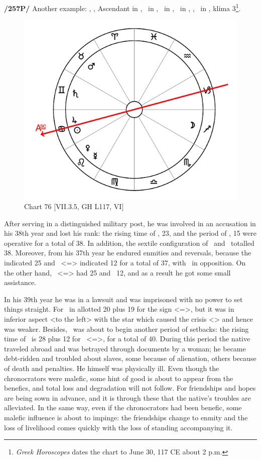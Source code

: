 \textbf{/257P/} Another example: \Sun, \Jupiter, Ascendant in \Cancer, \Moon\, in \Sagittarius, \Saturn\, in \Gemini,
\Mars\, in \Taurus, \Venus, \Mercury\, in \Leo, klima 3\footnote{\textit{Greek Horoscopes} dates the chart to June 30, 117 CE about 2 p.m.}.

\begin{figure}
\centering
\vspace{-20pt}
\includegraphics[width=.68\textwidth]{charts/7_3_5}
\caption{Chart 76 [VII.3.5, GH L117, VI]}
\label{fig:chart76}
\end{figure} 

After serving in a distinguished military post, he was involved in an accusation in his 38th year and lost his rank: the rising time of \Taurus, 23, and the period of \Mars, 15 were operative for a total of 38. In addition, the sextile configuration of \Saturn\, and \Venus\, totalled 38. Moreover, from his 37th year he endured enmities and reversals, because the \Moon\, indicated 25 and \Sagittarius\, <=\Jupiter> indicated 12 for a total of 37, with \Saturn\, in opposition. On the other hand, \Cancer\, <=\Moon> had 25 and \Jupiter\, 12, and as a result he got some small assistance. 

In his 39th year he was in a lawsuit and was imprisoned with no power to set things straight. For \Mercury\, in \Leo allotted 20
plus 19 for the sign <=\Sun>, but it was in inferior aspect <\Sextile to the left> with the star which caused the crisis <\Saturn> and hence was weaker. Besides, \Saturn\, was about to begin another period of setbacks: the rising time of \Gemini\, is 28 plus 12 for \Sagittarius\, <=\Jupiter>, for a total of 40. During this period the native traveled abroad and was betrayed through documents by a woman; he became debt-ridden and troubled about slaves, some because of alienation, others because of death and penalties. He himself was physically ill. Even though the chronocrators were malefic, some hint of good is about to appear from the benefics, and total loss and degradation will not follow. For friendships and hopes are being sown in advance, and it is through these that the native’s troubles are alleviated. In the same way, even if the chronocrators had been benefic, some malefic influence is about to impinge: the friendships change to enmity and the loss of livelihood comes quickly with the loss of standing accompanying it. 


